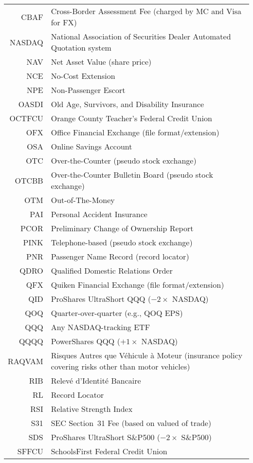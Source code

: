\documentclass[12pt,twoside]{article}
\begin{document}
\begin{longtable}[>{\bfseries}l]{>{\ttfamily}r l}
CBAF & Cross-Border Assessment Fee (charged by MC and Visa for FX) \\
NASDAQ & National Association of Securities Dealer Automated Quotation system \\
NAV & Net Asset Value (share price) \\
NCE & No-Cost Extension \\
NPE & Non-Passenger Escort \\
OASDI & Old Age, Survivors, and Disability Insurance \\
OCTFCU & Orange County Teacher's Federal Credit Union \\
OFX & Office Financial Exchange (file format/extension) \\
OSA & Online Savings Account \\
OTC & Over-the-Counter (pseudo stock exchange) \\
OTCBB & Over-the-Counter Bulletin Board (pseudo stock exchange) \\
OTM & Out-of-The-Money \\
PAI & Personal Accident Insurance \\
PCOR & Preliminary Change of Ownership Report \\
PINK & Telephone-based (pseudo stock exchange) \\
PNR & Passenger Name Record (record locator) \\
QDRO & Qualified Domestic Relations Order \\
QFX & Quiken Financial Exchange (file format/extension) \\
QID & ProShares UltraShort QQQ ($-2 \times$ NASDAQ) \\
QOQ & Quarter-over-quarter (e.g., QOQ EPS) \\
QQQ & Any NASDAQ-tracking ETF \\
QQQQ & PowerShares QQQ ($+1 \times$ NASDAQ) \\
RAQVAM & Risques Autres que V\'{e}hicule \`{a} Moteur (insurance policy covering risks other than motor vehicles) \\
RIB & Relev\'{e} d'Identit\'{e} Bancaire \\
RL & Record Locator \\
RSI & Relative Strength Index \\
S31 & SEC Section~31 Fee (based on valued of trade) \\
SDS & ProShares UltraShort S\&P500 ($-2 \times$ S\&P500) \\
SFFCU & SchoolsFirst Federal Credit Union \\

\end{longtable}
\end{document}
